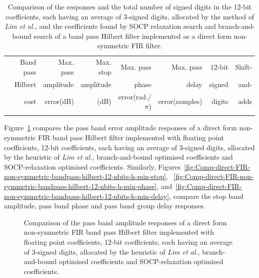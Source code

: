 \documentclass[a4paper,twoside,10pt,english]{article}
\newcommand{\DesignOfSchurLatticeFiltersPdfScale}{1}
\begin{document}
\begin{table}
\centering
\begin{threeparttable}
\begin{tabular}{lrrrrrrr} \\ \toprule
&Band pass&Max. pass&Max. stop&Max. pass        &Max. pass     &$12$-bit&Shift-\\
&Hilbert  &amplitude&amplitude&phase            &delay         &signed  &and-  \\
&cost     &error(dB)&(dB)     &error(rad./$\pi$)&error(samples)&digits  &adds  \\
\midrule

\\ \bottomrule
\end{tabular}
\end{threeparttable}
\caption[Comparison of band pass Hilbert direct form non-symmetric FIR filter
implementations]
{Comparison of the responses and the total number of signed digits in the
  12-bit coefficients, each having an average of 3-signed digits, allocated by
  the method of \emph{Lim et al.}, and the coefficients found by SOCP relaxation
  search and branch-and-bound search of a band pass Hilbert filter implemented
  as a direct form non-symmetric FIR filter.}
\label{tab:Comp-direct-FIR-non-symmetric-bandpass-hilbert-12-nbits-h-min-cost}
\end{table}

Figure~\ref{fig:Comp-direct-FIR-non-symmetric-bandpass-hilbert-12-nbits-h-min-pass}
compares the pass band error amplitude responses of a direct form non-symmetric
FIR band pass Hilbert filter implemented with floating point coefficients,
12-bit coefficients, each having an average of 3-signed digits, allocated by
the heuristic of \emph{Lim et al.}, branch-and-bound optimised coefficients
and SOCP-relaxation optimised coefficients. Similarly,
Figures~\ref{fig:Comp-direct-FIR-non-symmetric-bandpass-hilbert-12-nbits-h-min-stop},
~\ref{fig:Comp-direct-FIR-non-symmetric-bandpass-hilbert-12-nbits-h-min-phase},
and~\ref{fig:Comp-direct-FIR-non-symmetric-bandpass-hilbert-12-nbits-h-min-delay},
compare the stop band amplitude, pass band phase and pass band group delay
responses.

\begin{figure}
\centering
\scalebox{\DesignOfSchurLatticeFiltersPdfScale}{}
\caption{Comparison of the pass band amplitude responses of a direct form
  non-symmetric FIR band pass Hilbert filter implemented with floating point
  coefficients, 12-bit coefficients, each having an average of 3-signed digits,
  allocated by the heuristic of \emph{Lim et al.}, branch-and-bound optimised
  coefficients and SOCP-relaxation optimised coefficients.}
\label{fig:Comp-direct-FIR-non-symmetric-bandpass-hilbert-12-nbits-h-min-pass}
\end{figure}
\end{document}
